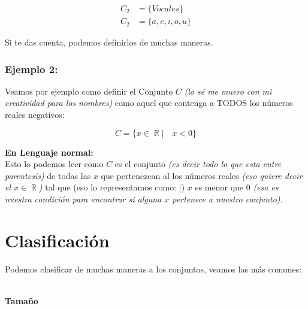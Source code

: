\documentclass[12pt]{report}                                    %
\DeclareMathOperator \Reals {\mathbb{R}}                        %
\begin{document}
                \begin{equation*}   
                \begin{split}   
                    C_2 &= \{ Vocales \}       \\
                    C_2 &= \{a, e, i, o, u \}
                \end{split}   
                \end{equation*}

                Si te das cuenta, podemos definirlos de muchas maneras.


            \subsubsection*{Ejemplo 2:}

                Veamos por ejemplo como definir el Conjunto $C$ \emph{(lo sé me muero con
                mi creatividad para los nombres)} como aquel que contenga a TODOS los números
                reales negativos:

                \begin{equation*}   
                    C = \{ x \in \Reals |\quad x < 0 \}
                \end{equation*}

                \textbf{En Lenguaje normal:\\}
                Esto lo podemos leer como $C$ es el conjunto \emph{(es decir todo lo que esta
                entre parentesís)} de todas las $x$ que pertenezcan al los números reales
                \emph{(eso quiere decir el $x \in \Reals$)} tal que (eso lo representamos
                como: $|$) $x$ es menor que 0 \emph{(esa es nuestra condición para
                encontrar si alguna $x$ pertenece a nuestro conjunto)}.



    \clearpage
    \section{Clasificación}
            
        Podemos clasificar de muchas maneras a los conjuntos, veamos las más comunes:

        \textbf{\large \\Tamaño}
\end{document}
